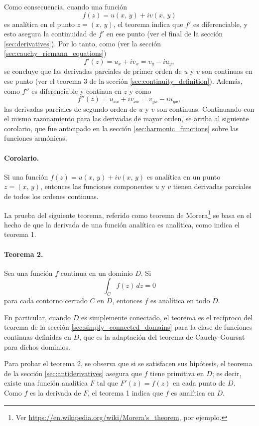 \documentclass[a4paper]{report}
\begin{document}
Como consecuencia, cuando una función
\[
 f(z)=u(x,\,y)+iv(x,\,y)
\]
es analítica en el punto \(z=(x,\,y)\), el teorema indica que \(f'\) es diferenciable, y esto asegura la continuidad de \(f'\) en ese punto (ver el final de la sección \ref{sec:derivatives}). Por lo tanto, como (ver la sección \ref{sec:cauchy_riemann_equations})
\[
 f'(z)=u_x+iv_x=v_y-iu_y,
\]
se concluye que las derivadas parciales de primer orden de \(u\) y \(v\) son continuas en ese punto (ver el teorema 3 de la sección \ref{sec:continuity_definition}). Además, como \(f''\) es diferenciable y continua en \(z\) y como
\[
 f''(z)=u_{xx}+iv_{xx}=v_{yx}-iu_{yx},
\]
las derivadas parciales de segundo orden de \(u\) y \(v\) son continuas. Continuando con el mismo razonamiento para las derivadas de mayor orden, se arriba al siguiente corolario, que fue anticipado en la sección \ref{sec:harmonic_functions} sobre las funciones armónicas.

\paragraph{Corolario.} Si una función \(f(z)=u(x,\,y)+iv(x,\,y)\) es analítica en un punto \(z=(x,\,y)\), entonces las funciones componentes \(u\) y \(v\) tienen derivadas parciales de todos los ordenes continuas.

La prueba del siguiente teorema, referido como teorema de Morera\footnote{Ver \href{https://en.wikipedia.org/wiki/Morera\%27s\_theorem}{https://en.wikipedia.org/wiki/Morera's\_theorem}, por ejemplo.} se basa en el hecho de que la derivada de una función analítica es analítica, como indica el teorema 1.

\paragraph{Teorema 2.} Sea una función \(f\) continua en un dominio \(D\). Si
\[
 \int_Cf(z)\,dz=0
\]
para cada contorno cerrado \(C\) en \(D\), entonces \(f\) es analítica en todo \(D\).

En particular, cuando \(D\) es simplemente conectado, el teorema es el recíproco del teorema de la sección \ref{sec:simply_connected_domains} para la clase de funciones continuas definidas en \(D\), que es la adaptación del teorema de Cauchy-Goursat para dichos dominios.

Para probar el teorema 2, se observa que si se satisfacen sus hipótesis, el teorema de la sección \ref{sec:antiderivatives} asegura que \(f\) tiene primitiva en \(D\); es decir, existe una función analítica \(F\) tal que \(F'(z)=f(z)\) en cada punto de \(D\). Como \(f\) es la derivada de \(F\), el teorema 1 indica que \(f\) es analítica en \(D\).
\end{document}
